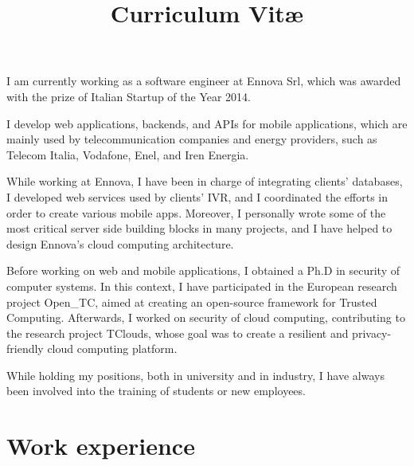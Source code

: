 \documentclass[a4paper,sans]{moderncv} %
\title{Curriculum Vit\ae}
\newcommand{\experience}{Experience}
\newcommand{\otc}{Open\_TC}
\renewcommand{\experience}{Esperienze di lavoro}
\renewcommand{\experience}{Work experience}
\begin{document}
\maketitle

\justify
I am currently working as a software engineer at Ennova Srl,
  which was awarded with the prize of Italian Startup of the Year 2014.

  I develop web applications, backends, and APIs for mobile applications,
  which are mainly used by telecommunication companies and energy providers,
  such as Telecom Italia, Vodafone, Enel, and Iren Energia.

  While working at Ennova, I have been in charge of integrating clients' databases,
  I developed web services used by clients’ IVR,
  and I coordinated the efforts in order to create various mobile apps.
  Moreover, I personally wrote some of the most critical server side building blocks in many projects,
  and I have helped to design Ennova's cloud computing architecture.

  Before working on web and mobile applications, I obtained a Ph.D in security of computer systems.
  In this context, I have participated in the European research project \otc,
  aimed at creating an open-source framework for Trusted Computing.
  Afterwards, I worked on security of cloud computing, contributing to the research project TClouds,
  whose goal was to create a resilient and privacy-friendly cloud computing platform.

  While holding my positions, both in university and in industry,
  I have always been involved into the training of students or new employees.

  \section{\experience}

\end{document}
